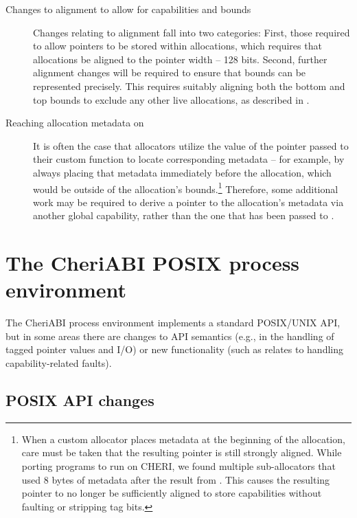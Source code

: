 \documentclass[12pt,twoside,openright,a4paper]{article}
\newcommand{\ccode}[1]{{\small\ttfamily{#1}}}
\newcommand{\cfunc}[1]{{\ccode{#1()}}}
\newcommand{\note}[2]{{\color{blue}[ Note: #1 - #2]}}
\renewcommand{\note}[2]{\relax\ifhmode\unskip\fi}
\newcommand{\arnote}[1]{\note{#1}{Alex R.}}
\begin{document}
\begin{description}
\item[Changes to alignment to allow for capabilities and bounds]
  Changes relating to alignment fall into two categories:
  First, those required to allow pointers to be stored within allocations,
  which requires that allocations be aligned to the pointer width -- 128 bits.
  Second, further alignment changes will be required to ensure that bounds can
  be represented precisely.
  This requires suitably aligning both the bottom and top bounds to exclude
  any other live allocations, as described in
  .\arnote{May want to switch order of sections?}

\item[Reaching allocation metadata on \cfunc{free}]
  It is often the case that allocators utilize the value of the pointer passed
  to their custom \cfunc{free} function to locate corresponding metadata --
  for example, by always placing that metadata immediately before the
  allocation, which would be outside of the allocation's bounds.\footnote{%
  When a custom allocator places metadata at the beginning of the allocation,
  care must be taken that the resulting pointer is still strongly aligned.
  While porting programs to run on CHERI, we found multiple sub-allocators
  that used 8 bytes of metadata after the result from \cfunc{malloc}.
  This causes the resulting pointer to no longer be sufficiently aligned to
  store capabilities without faulting or stripping tag bits.
  \note{Does CHERI ISAv7 still fault in any of these scenarios?}{nwf}
  }
  Therefore, some additional work may be required to derive a pointer to the
  allocation's metadata via another global capability, rather than the one
  that has been passed to \cfunc{free}.
\end{description}

\section{The CheriABI POSIX process environment}
\label{sec:cheriabi}

The CheriABI process environment implements a standard POSIX/UNIX API, but in
some areas there are changes to API semantics (e.g., in the handling of tagged
pointer values and I/O) or new functionality (such as relates to handling
capability-related faults).

\subsection{POSIX API changes}
\end{document}
